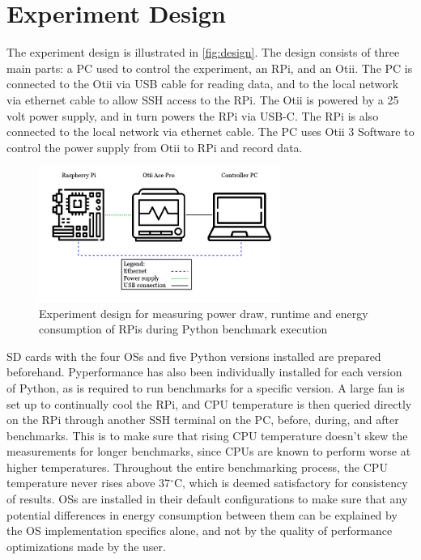 \section{Experiment Design}
\label{sec:experimentdesign}
The experiment design is illustrated in \autoref{fig:design}. The design consists of three main parts: a PC used to control the experiment, an RPi, and an Otii. The PC is connected to the Otii via USB cable for reading data, and to the local network via ethernet cable to allow SSH access to the RPi. The Otii is powered by a 25 volt power supply, and in turn powers the RPi via USB-C. The RPi is also connected to the local network via ethernet cable. The PC uses Otii 3 Software to control the power supply from Otii to RPi and record data.

\begin{figure}[H]
    \centering
    \includegraphics[width=0.7\textwidth]{images/experiment.png}
    \caption{Experiment design for measuring power draw, runtime and energy consumption of RPis during Python benchmark execution}
    \label{fig:design}
\end{figure}

SD cards with the four OSs and five Python versions installed are prepared beforehand. Pyperformance has also been individually installed for each version of Python, as is required to run benchmarks for a specific version. A large fan is set up to continually cool the RPi, and CPU temperature is then queried directly on the RPi through another SSH terminal on the PC, before, during, and after benchmarks. This is to make sure that rising CPU temperature doesn't skew the measurements for longer benchmarks, since CPUs are known to perform worse at higher temperatures\cite{benoit2020impact}. Throughout the entire benchmarking process, the CPU temperature never rises above 37$^{\circ}$C, which is deemed satisfactory for consistency of results. OSs are installed in their default configurations to make sure that any potential differences in energy consumption between them can be explained by the OS implementation specifics alone, and not by the quality of performance optimizations made by the user.

